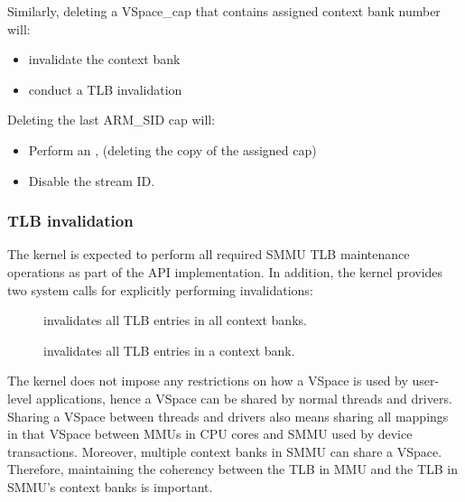Similarly, deleting a VSpace\_cap that contains assigned context bank number will:
\begin{itemize}
    \item invalidate the context bank
    \item conduct a TLB invalidation
\end{itemize}

Deleting the last ARM\_SID cap will:
\begin{itemize}
    \item Perform an ,
        (deleting the copy of the assigned  cap)
    \item Disable the stream ID.
\end{itemize}

\subsubsection{TLB invalidation}
\label{sec:smmuv2-tlb-invalidation}
The kernel is expected to perform all required SMMU TLB maintenance operations
as part of the API implementation.  In addition, the kernel provides two system
calls for explicitly performing invalidations:
\begin{description}
    \item[]
        invalidates all TLB entries in all
    context banks.
    \item[]
        invalidates all TLB entries in a context bank.
\end{description}

The kernel does not impose any restrictions on how a VSpace is used by user-level
applications, hence a VSpace can be shared by normal threads and drivers. Sharing
a VSpace between threads and drivers also means sharing all mappings in that
VSpace between MMUs in CPU cores and SMMU used by device transactions. Moreover,
multiple context banks in SMMU can share a VSpace. Therefore, maintaining the
coherency between the TLB in MMU and the TLB in SMMU's context banks is important.

